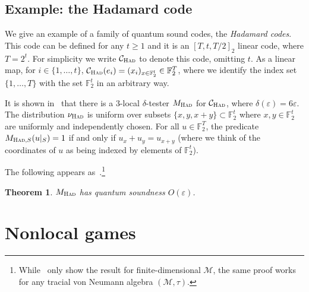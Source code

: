 \documentclass[11pt]{article}
\newtheorem{theorem}{Theorem}[section]
\theoremstyle{definition}
\newcommand{\code}{\mathcal{C}}
\newcommand{\field}{\mathbb{F}_2}
\newcommand{\N}{\ensuremath{\mathbb{N}}}
\newcommand{\mM}{\ensuremath{\mathcal{M}}}
\newcommand{\had}{\textsc{Had}}
\newcommand{\eps}{\varepsilon}
\begin{document}
		
		
\subsection{Example: the Hadamard code}
\label{sec:had}

We give an example of a family of quantum sound codes, the \emph{Hadamard codes}. This code can be defined for any  $t\geq 1$ and it is an $[T,t,T/2]_2$ linear code, where $T=2^t$. For simplicity we write  $\code_\had$ to denote this code, omitting $t$. As a linear map, for $i\in\{1,\ldots,t\}$, $\code_\had(e_i) = (x_i)_{x\in \field^t} \in \field^T$, where we identify the index set $\{1,\ldots,T\}$ with the set $\field^t$ in an arbitrary way.  

 It is shown in~\cite{blum1990self} that there is a $3$-local $\delta$-tester $M_\had$ for $\code_\had$, where $\delta(\eps)=6\eps$. The distribution $\nu_\had$ is uniform over subsets $\{ x, y, x+y \} \subset \field^t$ where $x,y\in \field^t$ are uniformly and independently chosen. For all $u \in \field^T$, the predicate $M_{\had,S}(u|_S) = 1$ if and only if $u_x + u_y = u_{x+y}$ (where we think of the coordinates of $u$ as being indexed by elements of $\field^t$). 


The following appears as~\cite[Theorem 10]{natarajan2016robust}.\footnote{While~\cite{natarajan2016robust} only show the result for finite-dimensional $\mM$, the same proof works for any tracial von Neumann algebra $(\mM,\tau)$.}
 
\begin{theorem}\label{thm:had-qsound}
$M_\had$ has quantum soundness $O(\eps)$.
\end{theorem}

%
%
%


\section{Nonlocal games}
\end{document}
